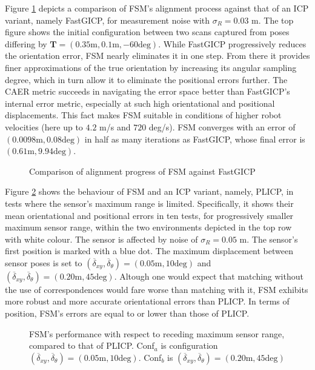Figure \ref{fig:char_fsm_vs_FGI} depicts a comparison of FSM's alignment
process against that of an ICP variant, namely FastGICP, for measurement noise
with $\sigma_R = 0.03$ m. The top figure shows the initial configuration
between two scans captured from poses differing by $\bm{T} = (0.35 \text{m},
0.1 \text{m}, -60 \text{deg})$. While FastGICP progressively reduces the
orientation error, FSM nearly eliminates it in one step. From there it provides
finer approximations of the true orientation by increasing its angular sampling
degree, which in turn allow it to eliminate the positional errors further. The
CAER metric succeeds in navigating the error space better than FastGICP's
internal error metric, especially at such high orientational and positional
displacements. This fact makes FSM suitable in conditions of higher robot
velocities (here up to $4.2$ m/s and $720$ deg/s). FSM converges with an error
of $(0.0098 \text{m}, 0.08 \text{deg})$ in half as many iterations as FastGICP,
whose final error is $(0.61 \text{m}, 9.94 \text{deg})$.

\begin{figure}
    \vspace{0.2cm}
    
    \caption{\small Comparison of alignment progress of FSM against FastGICP}%
    \label{fig:char_fsm_vs_FGI}%
\end{figure}

Figure \ref{fig:char_max_range_test} shows the behaviour of FSM and an ICP
variant, namely, PLICP, in tests where the sensor's maximum range is limited.
Specifically, it shows their mean orientational and positional errors in ten
tests, for progressively smaller maximum sensor range, within the two
environments depicted in the top row with white colour. The sensor is affected
by noise of $\sigma_R = 0.05$ m. The sensor's first position is marked with a
blue dot. The maximum displacement between sensor poses is set to
$(\overline{\delta}_{xy}, \overline{\delta}_{\theta}) = (0.05 \text{m}, 10 \text{deg})$
and
$(\overline{\delta}_{xy}, \overline{\delta}_{\theta}) = (0.20 \text{m}, 45 \text{deg})$.
Altough one would expect that matching without the use of correspondences would
fare worse than matching with it, FSM exhibits more robust and more accurate
orientational errors than PLICP. In terms of position, FSM's errors are equal to
or lower than those of PLICP.


\begin{figure}\centering
\vspace{-0.2cm}
    
    \vspace{-2.0cm}
    \caption{\small FSM's performance with respect to receding maximum sensor
             range, compared to that of PLICP. Conf$_a$ is configuration
             $(\overline{\delta}_{xy}, \overline{\delta}_{\theta}) = (0.05 \text{m}, 10 \text{deg})$.
             Conf$_b$ is
             $(\overline{\delta}_{xy}, \overline{\delta}_{\theta}) = (0.20 \text{m}, 45 \text{deg})$
             }%
    \label{fig:char_max_range_test}%
\end{figure}
